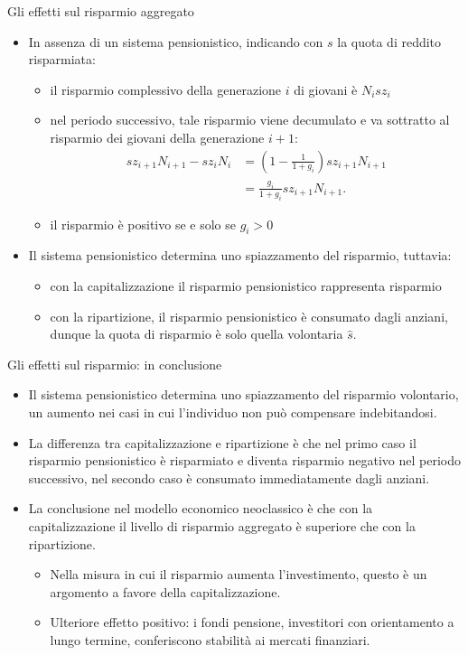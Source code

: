 \documentclass[11pt]{beamer}
\begin{document}
\begin{frame}{Gli effetti sul risparmio aggregato}
\begin{itemize}
\item In assenza di un sistema pensionistico, indicando con $s$ la quota di
reddito risparmiata:
\begin{itemize}
\item il risparmio complessivo della generazione $i$ di giovani è $N_isz_i$
\item nel periodo successivo, tale risparmio viene decumulato e va sottratto al
risparmio dei giovani della generazione $i+1$:
\begin{equation*}
\begin{split}
sz_{i+1}N_{i+1}-sz_iN_i&=\left(1-\frac{1}{1+g_i}\right)sz_{i+1}N_{i+1} \\
&= \frac{g_i}{1+g_i}sz_{i+1}N_{i+1}.
\end{split}
\end{equation*}
\item il risparmio è positivo se e solo se $g_i>0$
\end{itemize}
\item Il sistema pensionistico determina uno spiazzamento del risparmio, tuttavia:
\begin{itemize}
\item con la capitalizzazione il risparmio pensionistico rappresenta risparmio
\item con la ripartizione, il risparmio pensionistico è consumato dagli anziani,
dunque la quota di risparmio è solo quella volontaria $\hat s$.
\end{itemize}
\end{itemize}
\end{frame}


\begin{frame}{Gli effetti sul risparmio: in conclusione}
\begin{itemize}
\item Il sistema pensionistico determina uno spiazzamento del risparmio
volontario, un aumento nei casi in cui l'individuo non può compensare
indebitandosi.
\item La differenza tra capitalizzazione e ripartizione è che nel primo caso il
risparmio pensionistico è risparmiato e diventa risparmio negativo nel
periodo successivo, nel secondo caso è consumato immediatamente dagli
anziani.
\item La conclusione nel modello economico neoclassico è che con la
capitalizzazione il livello di risparmio aggregato è superiore che con la
ripartizione.
\begin{itemize}
\item Nella misura in cui il risparmio aumenta l'investimento, questo è un
argomento a favore della capitalizzazione.
\item Ulteriore effetto positivo: i fondi pensione, investitori con orientamento
a lungo termine, conferiscono stabilità ai mercati finanziari.
\end{itemize}
\end{itemize}
\end{frame}
\end{document}
